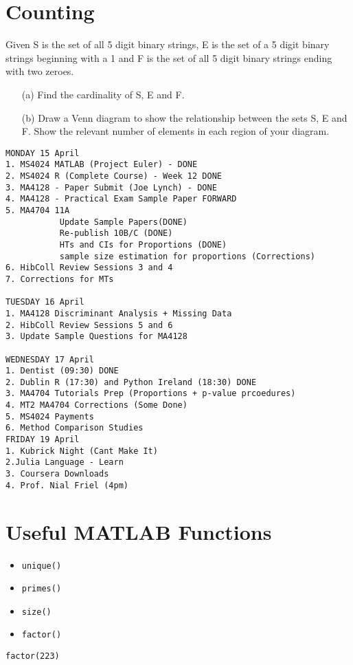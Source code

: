 \documentclass[12pt]{article} %
\begin{document}
\newpage
\section{Counting}
Given S is the set of all 5 digit binary strings, E is the set of a 5 digit
binary strings beginning with a 1 and F is the set of all 5 digit binary strings ending
with two zeroes.
\begin{itemize}
\item[(a)] Find the cardinality of S, E and F.
\item[(b)] Draw a Venn diagram to show the relationship between the sets S, E and F.
Show the relevant number of elements in each region of your diagram.
\end{itemize}
\newpage
\newpage
\begin{verbatim}
MONDAY 15 April
1. MS4024 MATLAB (Project Euler) - DONE
2. MS4024 R (Complete Course) - Week 12 DONE
3. MA4128 - Paper Submit (Joe Lynch) - DONE
4. MA4128 - Practical Exam Sample Paper FORWARD
5. MA4704 11A
           Update Sample Papers(DONE)
           Re-publish 10B/C (DONE)
           HTs and CIs for Proportions (DONE)
           sample size estimation for proportions (Corrections)
6. HibColl Review Sessions 3 and 4
7. Corrections for MTs

TUESDAY 16 April
1. MA4128 Discriminant Analysis + Missing Data 
2. HibColl Review Sessions 5 and 6
3. Update Sample Questions for MA4128

WEDNESDAY 17 April
1. Dentist (09:30) DONE
2. Dublin R (17:30) and Python Ireland (18:30) DONE
3. MA4704 Tutorials Prep (Proportions + p-value prcoedures)
4. MT2 MA4704 Corrections (Some Done)
5. MS4024 Payments
6. Method Comparison Studies
FRIDAY 19 April
1. Kubrick Night (Cant Make It)
2.Julia Language - Learn
3. Coursera Downloads
4. Prof. Nial Friel (4pm)
\end{verbatim}
\newpage
\section{Useful MATLAB Functions}

\begin{itemize}
\item \texttt{unique()}
\item \texttt{primes()}
\item \texttt{size()}
\item \texttt{factor()}
\end{itemize}
\begin{framed}
\begin{verbatim}
factor(223)

\end{verbatim}
\end{framed}
\end{document}
